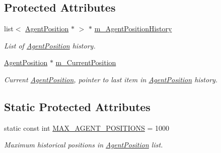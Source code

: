 \subsection*{Protected Attributes}
\begin{DoxyCompactItemize}
\item 
\hypertarget{class_agent_position_belief_ace58855dd73ac8893881d98fc64c5632}{
list$<$ \hyperlink{class_agent_position}{AgentPosition} $\ast$ $>$ $\ast$ \hyperlink{class_agent_position_belief_ace58855dd73ac8893881d98fc64c5632}{m\_\-AgentPositionHistory}}
\label{class_agent_position_belief_ace58855dd73ac8893881d98fc64c5632}

\begin{DoxyCompactList}\small\item\em List of \hyperlink{class_agent_position}{AgentPosition} history. \end{DoxyCompactList}\item 
\hypertarget{class_agent_position_belief_af01caa5517ec12e7177bb76c85b93714}{
\hyperlink{class_agent_position}{AgentPosition} $\ast$ \hyperlink{class_agent_position_belief_af01caa5517ec12e7177bb76c85b93714}{m\_\-CurrentPosition}}
\label{class_agent_position_belief_af01caa5517ec12e7177bb76c85b93714}

\begin{DoxyCompactList}\small\item\em Current \hyperlink{class_agent_position}{AgentPosition}, pointer to last item in \hyperlink{class_agent_position}{AgentPosition} history. \end{DoxyCompactList}\end{DoxyCompactItemize}
\subsection*{Static Protected Attributes}
\begin{DoxyCompactItemize}
\item 
\hypertarget{class_agent_position_belief_adbff6c8d58d81c6eddbe52535330132e}{
static const int \hyperlink{class_agent_position_belief_adbff6c8d58d81c6eddbe52535330132e}{MAX\_\-AGENT\_\-POSITIONS} = 1000}
\label{class_agent_position_belief_adbff6c8d58d81c6eddbe52535330132e}

\begin{DoxyCompactList}\small\item\em Maximum historical positions in \hyperlink{class_agent_position}{AgentPosition} list. \end{DoxyCompactList}\end{DoxyCompactItemize}


